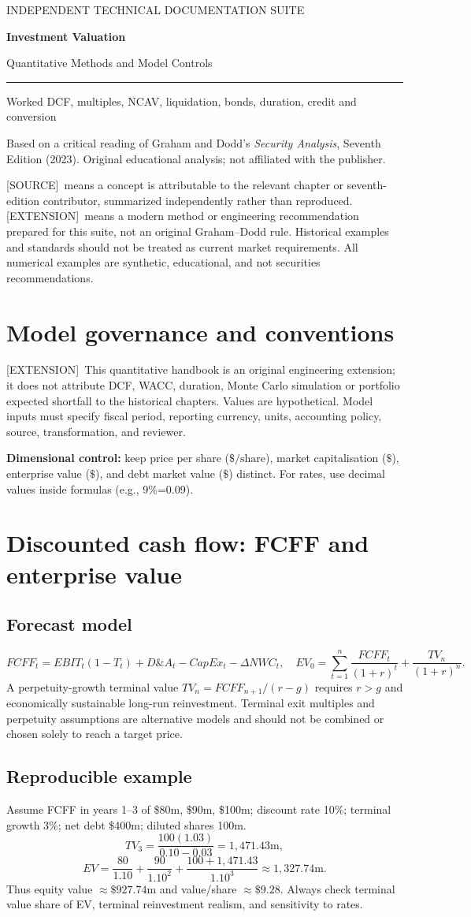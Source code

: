 \documentclass[11pt,letterpaper]{article}
\newcommand{\src}{\textsf{\color{sea}[SOURCE]}}
\newcommand{\ext}{\textsf{\color{gold}[EXTENSION]}}
\newcommand{\cover}[3]{%
\hypersetup{pageanchor=false}%
\begin{titlepage}\pagecolor{ink}\color{white}\vspace*{1.15in}
{\sffamily\large\color{gold}INDEPENDENT TECHNICAL DOCUMENTATION SUITE\par}\vspace{0.4in}
{\Huge\sffamily\bfseries #1\par}\vspace{0.15in}
{\Large\sffamily #2\par}\vspace{0.65in}
\color{gold}\rule{\textwidth}{2pt}\par\vspace{0.4in}
{\large #3\par}\vfill
{\small\sffamily Based on a critical reading of Graham and Dodd's \emph{Security Analysis}, Seventh Edition (2023). Original educational analysis; not affiliated with the publisher.\par}
\end{titlepage}\hypersetup{pageanchor=true}\nopagecolor\color{black}}
\newcommand{\front}[3]{\cover{#1}{#2}{#3}\tableofcontents\clearpage
\begin{sourcebox}\src\ means a concept is attributable to the relevant chapter or seventh-edition contributor, summarized independently rather than reproduced. \ext\ means a modern method or engineering recommendation prepared for this suite, not an original Graham--Dodd rule. Historical examples and standards should not be treated as current market requirements. All numerical examples are synthetic, educational, and not securities recommendations.\end{sourcebox}}
\begin{document}
\front{Investment Valuation}{Quantitative Methods and Model Controls}{Worked DCF, multiples, NCAV, liquidation, bonds, duration, credit and conversion}

\section{Model governance and conventions}
\ext\ This quantitative handbook is an original engineering extension; it does not attribute DCF, WACC, duration, Monte Carlo simulation or portfolio expected shortfall to the historical chapters. Values are hypothetical. Model inputs must specify fiscal period, reporting currency, units, accounting policy, source, transformation, and reviewer.
\begin{methodbox}\textbf{Dimensional control:} keep price per share ($\$/\text{share}$), market capitalisation ($\$$), enterprise value ($\$$), and debt market value ($\$$) distinct. For rates, use decimal values inside formulas (e.g., 9\%=0.09).\end{methodbox}

\section{Discounted cash flow: FCFF and enterprise value}
\subsection{Forecast model}
\[
FCFF_t=EBIT_t(1-T_t)+D\!\&A_t-CapEx_t-\Delta NWC_t,\quad
EV_0=\sum_{t=1}^{n}\frac{FCFF_t}{(1+r)^t}+\frac{TV_n}{(1+r)^n}.
\]
A perpetuity-growth terminal value $TV_n=FCFF_{n+1}/(r-g)$ requires $r>g$ and economically sustainable long-run reinvestment. Terminal exit multiples and perpetuity assumptions are alternative models and should not be combined or chosen solely to reach a target price.

\subsection{Reproducible example}
Assume FCFF in years 1--3 of \$80m, \$90m, \$100m; discount rate 10\%; terminal growth 3\%; net debt \$400m; diluted shares 100m.
\[
TV_3=\frac{100(1.03)}{0.10-0.03}=1{,}471.43\text{m},
\]
\[
EV=\frac{80}{1.10}+\frac{90}{1.10^2}+\frac{100+1{,}471.43}{1.10^3}
\approx1{,}327.74\text{m}.
\]
Thus equity value $\approx\$927.74$m and value/share $\approx\$9.28$. Always check terminal value share of EV, terminal reinvestment realism, and sensitivity to rates.
\end{document}
